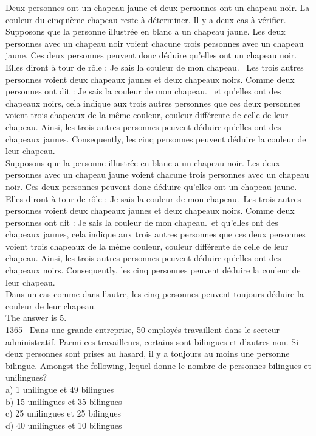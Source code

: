 ﻿\documentclass[letterpaper, 12pt]{article}
\begin{document}
Deux personnes ont un chapeau jaune et deux personnes ont un chapeau noir.
La couleur du cinqui\`eme
chapeau reste \`a d\'eterminer.  Il y a deux cas \`a v\'erifier.\\
Supposons que la personne illustr\'ee en blanc a un chapeau jaune.
Les deux personnes avec un chapeau noir voient chacune trois
personnes avec un chapeau jaune.  Ces deux personnes peuvent donc
d\'eduire qu'elles ont un chapeau noir.  Elles diront \`a tour de
r\^ole : \og Je sais la couleur de mon chapeau. \fg\ Les trois
autres personnes voient deux chapeaux jaunes et deux chapeaux noirs.
Comme deux personnes ont dit : \og Je sais la couleur de mon
chapeau. \fg\ et qu'elles ont des chapeaux noirs, cela indique aux
trois autres personnes que ces deux personnes voient trois chapeaux
de la m\^eme couleur, couleur diff\'erente de celle de leur chapeau.
Ainsi, les trois autres personnes peuvent d\'eduire qu'elles ont des
chapeaux jaunes. Consequently, les cinq personnes peuvent
d\'eduire la couleur de leur
chapeau.\\

Supposons que la personne illustr\'ee en blanc a un chapeau noir.
Les deux personnes avec un chapeau jaune voient chacune trois
personnes avec un chapeau noir.  Ces deux personnes peuvent donc
d\'eduire qu'elles ont un chapeau jaune.  Elles diront \`a tour de
r\^ole : \og Je sais la couleur de mon chapeau.\fg\ Les trois autres
personnes voient deux chapeaux jaunes et deux chapeaux noirs.  Comme
deux personnes ont dit : \og Je sais la couleur de mon chapeau.\fg\
et qu'elles ont des chapeaux jaunes, cela indique aux trois autres
personnes que ces deux personnes voient trois chapeaux de la m\^eme
couleur, couleur diff\'erente de celle de leur chapeau. Ainsi, les
trois autres personnes peuvent d\'eduire qu'elles ont des chapeaux
noirs.  Consequently, les cinq personnes peuvent d\'eduire la
couleur de
leur chapeau.\\

Dans un cas comme dans l'autre, les cinq personnes peuvent toujours
d\'eduire la couleur de leur chapeau.\\

The answer is 5.\\

1365-- Dans une grande entreprise, 50 employ\'es travaillent dans le secteur
administratif.  Parmi ces travailleurs, certains sont bilingues et d'autres
non.  Si deux personnes sont prises au hasard, il y a toujours au moins une
personne bilingue.  Amongst the following, lequel donne le
nombre de personnes bilingues et unilingues?\\
a) 1 unilingue et 49 bilingues\\
b) 15 unilingues et 35 bilingues\\
c) 25 unilingues et 25 bilingues\\
d) 40 unilingues et 10 bilingues\\
\end{document}
